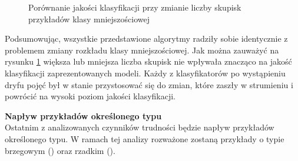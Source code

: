 \begin{figure}[h]
    \centering
    \qquad
    \qquad
    \caption{Porównanie jakości klasyfikacji przy zmianie liczby skupisk przykładów klasy mniejszościowej}\label{Figure:ChangeComposition}
\end{figure}

\noindent Podsumowując, wszystkie przedstawione algorytmy radziły sobie identycznie z problemem zmiany rozkładu klasy mniejszościowej. Jak można zauważyć na rysunku \ref{Figure:ChangeComposition} większa lub mniejsza liczba skupisk nie wpływała znacząco na jakość klasyfikacji zaprezentowanych modeli. Każdy z klasyfikatorów po wystąpieniu dryfu pojęć był w stanie przystosować się do zmian, które zaszły w strumieniu i powrócić na wysoki poziom jakości klasyfikacji.

\newpage

\noindent \textbf{Napływ przykładów określonego typu}\\

\noindent Ostatnim z analizowanych czynników trudności będzie napływ przykładów określonego typu. W ramach tej analizy rozważone zostaną przykłady o typie brzegowym () oraz rzadkim ().

